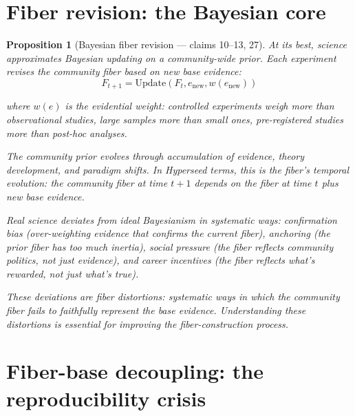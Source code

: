 \documentclass[11pt,a4paper]{article}
\newtheorem{proposition}[definition]{Proposition}
\begin{document}
\section{Fiber revision: the Bayesian core}
\label{sec:bayesian}

\begin{proposition}[Bayesian fiber revision --- claims 10--13, 27]
\label{prop:bayesian}
At its best, science approximates Bayesian updating on a community-wide
prior. Each experiment revises the community fiber based on new base
evidence:
\[
  F_{t+1} = \text{Update}(F_t, e_{\text{new}}, w(e_{\text{new}}))
\]

where $w(e)$ is the evidential weight: controlled experiments weigh
more than observational studies, large samples more than small ones,
pre-registered studies more than post-hoc analyses.

The community prior evolves through accumulation of evidence, theory
development, and paradigm shifts. In Hyperseed terms, this is the
fiber's temporal evolution: the community fiber at time $t+1$ depends
on the fiber at time $t$ plus new base evidence.

Real science deviates from ideal Bayesianism in systematic ways:
confirmation bias (over-weighting evidence that confirms the current
fiber), anchoring (the prior fiber has too much inertia), social
pressure (the fiber reflects community politics, not just evidence),
and career incentives (the fiber reflects what's rewarded, not just
what's true).

These deviations are \emph{fiber distortions}: systematic ways in which
the community fiber fails to faithfully represent the base evidence.
Understanding these distortions is essential for improving the
fiber-construction process.
\end{proposition}


\section{Fiber-base decoupling: the reproducibility crisis}
\label{sec:crisis}
\end{document}
